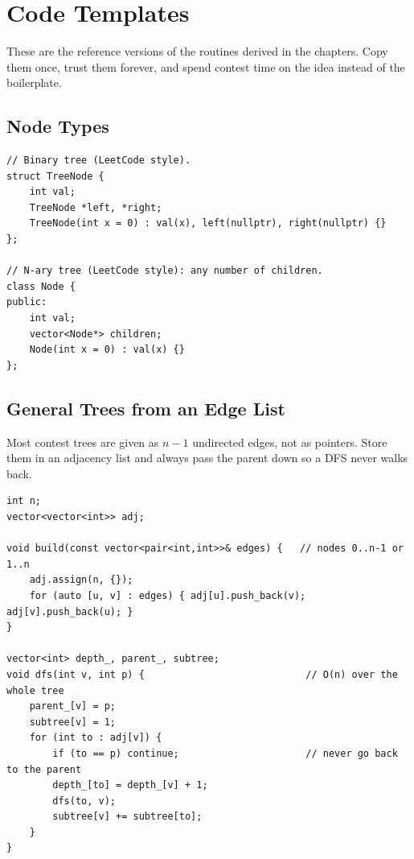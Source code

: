 \chapter{Code Templates}\label{ch:app-templates}

These are the reference versions of the routines derived in the chapters. Copy
them once, trust them forever, and spend contest time on the idea instead of the
boilerplate.

\section{Node Types}

\begin{lstlisting}[caption={Binary tree node and n-ary tree node (Chapter 1, Chapter 2)}, label={lst:app-node}]
// Binary tree (LeetCode style).
struct TreeNode {
    int val;
    TreeNode *left, *right;
    TreeNode(int x = 0) : val(x), left(nullptr), right(nullptr) {}
};

// N-ary tree (LeetCode style): any number of children.
class Node {
public:
    int val;
    vector<Node*> children;
    Node(int x = 0) : val(x) {}
};
\end{lstlisting}

\section{General Trees from an Edge List}

Most contest trees are given as $n-1$ undirected edges, not as pointers. Store them
in an adjacency list and always pass the parent down so a DFS never walks back.

\begin{lstlisting}[caption={Build adjacency and DFS with a parent guard (Chapter 1)}, label={lst:app-adj}]
int n;
vector<vector<int>> adj;

void build(const vector<pair<int,int>>& edges) {   // nodes 0..n-1 or 1..n
    adj.assign(n, {});
    for (auto [u, v] : edges) { adj[u].push_back(v); adj[v].push_back(u); }
}

vector<int> depth_, parent_, subtree;
void dfs(int v, int p) {                            // O(n) over the whole tree
    parent_[v] = p;
    subtree[v] = 1;
    for (int to : adj[v]) {
        if (to == p) continue;                      // never go back to the parent
        depth_[to] = depth_[v] + 1;
        dfs(to, v);
        subtree[v] += subtree[to];
    }
}
\end{lstlisting}


